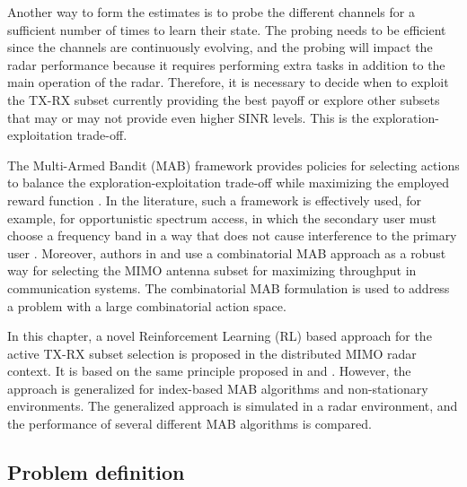 \documentclass[english, 12pt, a4paper, elec, utf8, a-1b, online]{aaltothesis}
\numberwithin{equation}{section}
\begin{document}
Another way to form the estimates is to probe the different channels for a sufficient number of times to learn their state.
The probing needs to be efficient since the channels are continuously evolving, and the probing will impact the radar performance because it requires performing extra tasks in addition to the main operation of the radar.  Therefore, it is necessary to decide when to exploit the TX-RX subset currently providing the best payoff or explore other subsets that may or may not provide even higher SINR levels. 
This is the exploration-exploitation trade-off.

The Multi-Armed Bandit (MAB) framework provides policies for selecting actions to balance the exploration-exploitation trade-off while maximizing the employed reward function \cite{Lattimore2019}.
In the literature, such a framework is effectively used, for example, for opportunistic spectrum access, in which the secondary user must choose a frequency band in a way that does not cause interference to the primary user \cite{Zhao2008}.
Moreover, authors in \cite{Mukherjee2012} and \cite{Kuai2019} use a combinatorial MAB approach as a robust way for selecting the MIMO antenna subset for maximizing throughput in communication systems.
The combinatorial MAB formulation is used to address a problem with a large combinatorial action space.

In this chapter, a novel Reinforcement Learning (RL) based approach for the active TX-RX subset selection is proposed in the distributed MIMO radar context. 
It is based on the same principle proposed in \cite{Mukherjee2012} and \cite{Kuai2019}. 
However, the approach is generalized for index-based MAB algorithms and non-stationary environments. 
The generalized approach is simulated in a radar environment, and the performance of several different MAB algorithms is compared.

\subsection{Problem definition}

\newcommand{\ntx}{{N_{\text{tx}}}}
\newcommand{\nrx}{{N_{\text{rx}}}}
\newcommand{\srx}{{M_{\text{rx}}}}
\newcommand{\stx}{{M_{\text{tx}}}}
\end{document}
